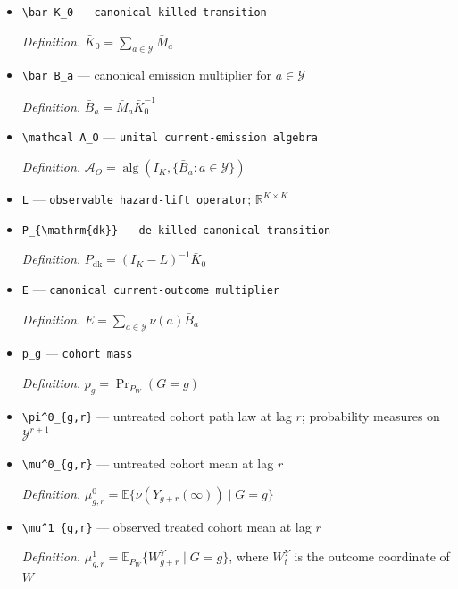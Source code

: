 \documentclass{article}
\begin{document}
\begin{itemize}
  \item \texttt{\textbackslash{}\allowbreak{}bar K\_\allowbreak{}0} --- \texttt{canonical killed transition}
  \par\smallskip\noindent\emph{Definition.} \(\bar K_0=\sum_{a\in\mathcal Y}\bar M_a\)
  \item \texttt{\textbackslash{}\allowbreak{}bar B\_\allowbreak{}a} --- canonical emission multiplier for \(a\in\mathcal Y\)
  \par\smallskip\noindent\emph{Definition.} \(\bar B_a=\bar M_a\bar K_0^{-1}\)
  \item \texttt{\textbackslash{}\allowbreak{}mathcal A\_\allowbreak{}O} --- \texttt{unital current-\allowbreak{}emission algebra}
  \par\smallskip\noindent\emph{Definition.} \(\mathcal A_O=\operatorname{alg}(I_K,\{\bar B_a:a\in\mathcal Y\})\)
  \item \texttt{L} --- \texttt{observable hazard-\allowbreak{}lift operator}; \(\mathbb R^{K\times K}\)
  \item \texttt{P\_\allowbreak{}\{\textbackslash{}\allowbreak{}mathrm\{dk\}\allowbreak{}\}\allowbreak{}} --- \texttt{de-\allowbreak{}killed canonical transition}
  \par\smallskip\noindent\emph{Definition.} \(P_{\mathrm{dk}}=(I_K-L)^{-1}\bar K_0\)
  \item \texttt{E} --- \texttt{canonical current-\allowbreak{}outcome multiplier}
  \par\smallskip\noindent\emph{Definition.} \(E=\sum_{a\in\mathcal Y}\nu(a)\bar B_a\)
  \item \texttt{p\_\allowbreak{}g} --- \texttt{cohort mass}
  \par\smallskip\noindent\emph{Definition.} \(p_g=\Pr_{P_W}(G=g)\)
  \item \texttt{\textbackslash{}\allowbreak{}pi\textasciicircum{}0\_\allowbreak{}\{g,\allowbreak{}r\}\allowbreak{}} --- untreated cohort path law at lag \(r\); probability measures on \(\mathcal Y^{r+1}\)
  \item \texttt{\textbackslash{}\allowbreak{}mu\textasciicircum{}0\_\allowbreak{}\{g,\allowbreak{}r\}\allowbreak{}} --- untreated cohort mean at lag \(r\)
  \par\smallskip\noindent\emph{Definition.} \(\mu^0_{g,r}=\mathbb E\{\nu(Y_{g+r}(\infty))\mid G=g\}\)
  \item \texttt{\textbackslash{}\allowbreak{}mu\textasciicircum{}1\_\allowbreak{}\{g,\allowbreak{}r\}\allowbreak{}} --- observed treated cohort mean at lag \(r\)
  \par\smallskip\noindent\emph{Definition.} \(\mu^1_{g,r}=\mathbb E_{P_W}\{W^Y_{g+r}\mid G=g\}\), where \(W^Y_t\) is the outcome coordinate of \(W\)

\end{itemize}
\end{document}
